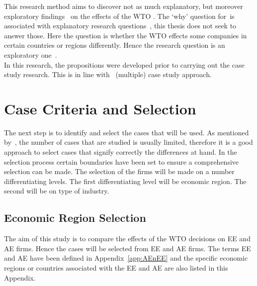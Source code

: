 This research method aims to discover not as much explanatory, but moreover exploratory findings~\cite{Yin:1981wc} on the effects of the WTO \rr.
The `why' question for~\mcs is associated with explanatory research questions~\cite{Yin:2009vh}, this thesis does not seek to answer those.
Here the question is whether the WTO effects some companies in certain countries or regions differently. 
Hence the research question is an exploratory one~\citep{Yin:2009vh,Miles:1994wi}.\\
In this research, the propositions were developed prior to carrying out the case study research. 
This is in line with~\citep{Yin:2009vh,Hyde:2000hf} (multiple) case study approach.

\section{Case Criteria and Selection}

The next step is to identify and select the cases that will be used. 
As mentioned by~\cite{Pettigrew:1990}, the number of cases that are studied is usually limited, therefore it is a good approach to select cases that signify correctly the differences at hand.
In the selection process certain boundaries have been set to ensure a comprehensive selection can be made.
The selection of the firms will be made on a number differentiating levels.
The first differentiating level will be economic region.
The second will be on type of industry.

\subsection{Economic Region Selection}

The aim of this study is to compare the effects of the \gls{WTO} decisions on  \gls{EE} and \gls{AE} firms.
Hence the cases will be selected from \gls{EE} and \gls{AE} firms.
The terms \gls{EE} and \gls{AE} have been defined in Appendix~\ref{app:AEnEE} and the specific economic regions or countries associated with the \gls{EE} and \gls{AE} are also listed in this Appendix.

